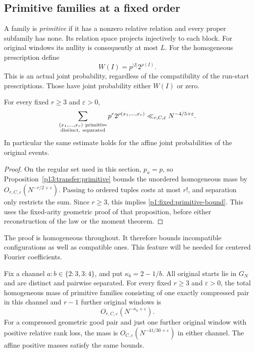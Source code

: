 \subsection{Primitive families at a fixed order}

A family is \emph{primitive} if it has a nonzero relative
relation and every proper subfamily has none. Its relation
space projects injectively to each block. For original
windows its nullity is consequently at most \(L\).
For the homogeneous prescription define
\[
 W(I)=p^{|I|}2^{\rho(I)}.
\]
This is an actual joint probability, regardless of the
compatibility of the run-start prescriptions. Those have
joint probability either \(W(I)\) or zero.

\begin{proposition}
\label{p1:fixed:primitive}
For every fixed \(r\ge3\) and \(\varepsilon>0\),
\begin{equation}
 \sum_{\substack{(x_1,\ldots,x_r)\ {\rm primitive}\\
                  {\rm distinct,\ separated}}}
          p^r2^{\rho(x_1,\ldots,x_r)}
        \ll_{r,C,\varepsilon}N^{-4/5+\varepsilon}.
 \label{p1:fixed:primitive-bound}
\end{equation}
In particular the same estimate holds for the affine
joint probabilities of the original events.
\end{proposition}

\begin{proof}
On the regular set used in this section, $p_x=p$, so
Proposition~\ref{p13:transfer:primitive} bounds the unordered homogeneous
mass by $O_{r,C,\varepsilon}(N^{-r/2+\varepsilon})$.
Passing to ordered tuples costs at most $r!$, and separation only
restricts the sum. Since $r\ge3$, this implies
\eqref{p1:fixed:primitive-bound}.
This uses the fixed-arity geometric proof of that proposition,
before either reconstruction of the law or the moment theorem.
\end{proof}

The proof is homogeneous throughout. It therefore bounds
incompatible configurations as well as compatible ones.
This feature will be needed for centered Fourier coefficients.

\begin{proposition}
\label{p1:fixed:compressed}
Fix a channel \(a:b\in\{2:3,3:4\}\), and put
\(\kappa_b=2-1/b\). All original starts lie in \(G_N\) and are
distinct and pairwise separated. For every fixed \(r\ge3\) and
\(\varepsilon>0\), the total
homogeneous mass of primitive families consisting of
one exactly compressed pair in this channel and
\(r-1\) further original windows is
\begin{equation}
 O_{r,C,\varepsilon}
       (N^{-\kappa_b+\varepsilon}).
 \label{p1:fixed:compressed-bound}
\end{equation}
For a compressed geometric good pair and just one further original
window with positive relative rank loss, the mass is
\(O_{C,\varepsilon}(N^{-41/30+\varepsilon})\) in either channel.
The affine positive masses satisfy the same bounds.
\end{proposition}

